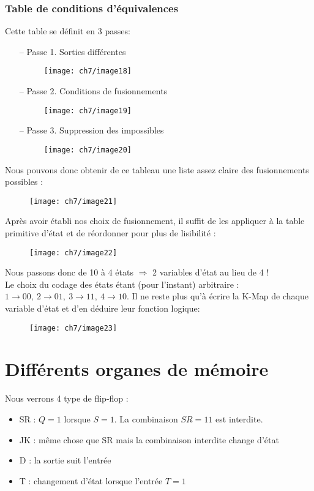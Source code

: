 \subsubsection{Table de conditions d'équivalences}
Cette table se définit en 3 passes:
\begin{enumerate}
	\item[-- Passe 1.] Sorties différentes
	\begin{figure}[H]
		\centering
		\texttt{[image: ch7/image18]}
	\end{figure}
	\item[-- Passe 2.] Conditions de fusionnements 
	\begin{figure}[H]
		\centering
		\texttt{[image: ch7/image19]}
	\end{figure}
	\item[-- Passe 3.] Suppression des impossibles
	\begin{figure}[H]
		\centering
		\texttt{[image: ch7/image20]}
	\end{figure}
\end{enumerate}
Nous pouvons donc obtenir de ce tableau une liste assez claire des fusionnements possibles :
\begin{figure}[H]
	\centering
	\texttt{[image: ch7/image21]}
\end{figure}
Après avoir établi nos choix de fusionnement, il suffit de les appliquer à la table primitive d'état et de réordonner pour plus de lisibilité :
\begin{figure}[H]
	\centering
	\texttt{[image: ch7/image22]}
\end{figure}
Nous passons donc de 10 à 4 états $\Rightarrow$ 2 variables d'état au lieu de 4 !\\

Le choix du codage des états étant (pour l'instant) arbitraire : $1\rightarrow 00,\ 2\rightarrow 01,\ 3\rightarrow 11,\ 4\rightarrow 10$. Il ne reste plus qu'à écrire la K-Map de chaque variable d'état et d'en déduire leur fonction logique:
 \begin{figure}[H]
 	\centering
 	\texttt{[image: ch7/image23]}
 \end{figure}
\section{Différents organes de mémoire}
Nous verrons 4 type de flip-flop :
\begin{itemize}
	\item SR : $Q=1$ lorsque $S=1$. La combinaison $SR=11$ est interdite.
	\item JK : même chose que SR mais la combinaison interdite change d'état
	\item D : la sortie suit l'entrée
	\item T : changement d'état lorsque l'entrée $T=1$
\end{itemize}
